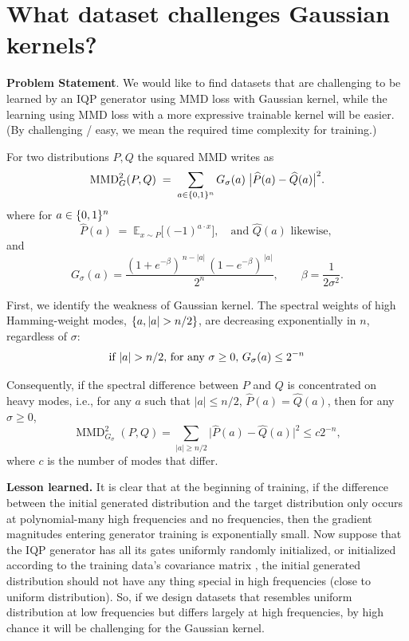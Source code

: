 \documentclass[a4paper,onecolumn,notitlepage,nofootinbib,longbibliography,superscriptaddress, floatfix, pra, aps, 10pt]{revtex4-2}
\begin{document}
\section{What dataset challenges Gaussian kernels?}
\textbf{Problem Statement}. We would like to find datasets that are challenging to be learned by an IQP generator using MMD loss with Gaussian kernel, while the learning using MMD loss with a more expressive trainable kernel will be easier. (By challenging / easy, we mean the required time complexity for training.)

For two distributions $P,Q$ the squared MMD writes as
\begin{equation}\label{eq:mmd-sum}
\operatorname{MMD}^2_G(P,Q)\;=\;
   \sum_{a\in\{0,1\}^n} G_\sigma(a)\;\bigl\lvert\widehat P(a)-\widehat Q(a)\bigr\rvert^{2}.
\end{equation} where for $a\in\{0,1\}^n$
\[
\widehat{P}(a)\;=\;\mathbb{E}_{x\sim P}\bigl[(-1)^{a\cdot x}\bigr], \quad \text{and $\widehat{Q}(a)$ likewise, }
\]
and 
\begin{equation}
G_\sigma(a)
=\frac{(1+e^{-\beta})^{\,n-|a|}\,(1-e^{-\beta})^{\,|a|}}{2^{n}}, \qquad \beta = \frac{1}{2\sigma^2}.
\end{equation}

First, we identify the weakness of Gaussian kernel. The spectral weights of high Hamming-weight modes, $\{a, \abs{a}> n/2\}$, are decreasing exponentially in $n$, regardless of $\sigma$: 
\begin{equation}\text{if } \abs{a}> n/2 \text{, for any $\sigma \geq 0$, } G_{\sigma}(a) \leq 2^{-n}
\end{equation}


Consequently, if the spectral difference between $P$ and $Q$ is concentrated on heavy modes, i.e., for any $a$ such that $|a|\le n/2$, $\widehat P(a) = \widehat Q(a)$,
then for any $\sigma \geq 0$,
\begin{equation}
\operatorname{MMD}^2_{G_\sigma}(P,Q) = \sum_{|a|\ge n/2}\bigl|\widehat P(a)-\widehat Q(a)\bigr|^{2} \le c 2^{-n}, \end{equation}
where $c$ is the number of modes that differ.

\textbf{Lesson learned.} It is clear that at the beginning of training, if the difference between the initial generated distribution and the target distribution only occurs at polynomial-many high frequencies and no frequencies, then the gradient magnitudes entering generator training is exponentially small. Now suppose that the IQP generator has all its gates uniformly randomly initialized, or initialized according to the training data's covariance matrix \cite{recio2025train}, the initial generated distribution should not have any thing special in high frequencies (close to uniform distribution). So, if we design datasets that resembles uniform distribution at low frequencies but differs largely at high frequencies, by high chance it will be challenging for the Gaussian kernel. 
\end{document}
